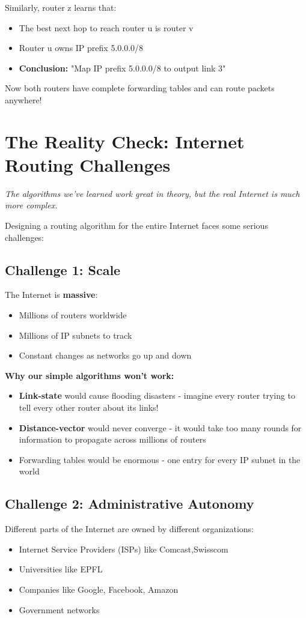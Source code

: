 \documentclass[../../compsys.tex]{subfiles}
\begin{document}
Similarly, router z learns that:
\begin{itemize}
    \item The best next hop to reach router u is router v
    \item Router u owns IP prefix 5.0.0.0/8
    \item \textbf{Conclusion:} "Map IP prefix 5.0.0.0/8 to output link 3"
\end{itemize}

Now both routers have complete forwarding tables and can route packets anywhere!


\section{The Reality Check: Internet Routing Challenges}
\textit{The algorithms we've learned work great in theory, but the real Internet is much more complex.}

Designing a routing algorithm for the entire Internet faces some serious challenges:

\subsection{Challenge 1: Scale}
The Internet is \textbf{massive}:
\begin{itemize}
    \item Millions of routers worldwide
    \item Millions of IP subnets to track
    \item Constant changes as networks go up and down
\end{itemize}

\textbf{Why our simple algorithms won't work:}
\begin{itemize}
    \item \textbf{Link-state} would cause flooding disasters - imagine every router trying to tell every other router about its links!
    \item \textbf{Distance-vector} would never converge - it would take too many rounds for information to propagate across millions of routers
    \item Forwarding tables would be enormous - one entry for every IP subnet in the world
\end{itemize}

\subsection{Challenge 2: Administrative Autonomy}
Different parts of the Internet are owned by different organizations:
\begin{itemize}
    \item Internet Service Providers (ISPs) like Comcast,Swisscom
    \item Universities like EPFL
    \item Companies like Google, Facebook, Amazon
    \item Government networks
\end{itemize}
\end{document}
